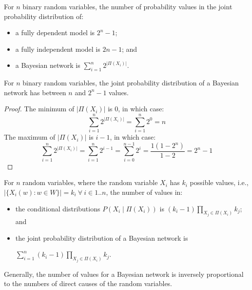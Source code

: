 For $n$ binary random variables, the number of probability values in the joint
probability distribution of:
\begin{itemize}
  \item a fully dependent model is $2^n - 1$;
  \item a fully independent model is $2n - 1$; and
  \item a Bayesian network is $\sum_{i = 1}^{n} 2^{|\Pi(X_i)|}$.
\end{itemize}

\begin{thm}
  For $n$ binary random variables, the joint probability distribution of a
  Bayesian network has between $n$ and $2^n - 1$ values.
  \begin{proof}
    The minimum of $|\Pi(X_i)|$ is 0, in which case:
    \begin{equation}
      \sum_{i = 1}^{n} 2^{|\Pi(X_i)|} = \sum_{i = 1}^{n} 2^0 = n
    \end{equation}
    The maximum of $|\Pi(X_i)|$ is $i - 1$, in which case:
    \begin{equation}
      \sum_{i = 1}^{n} 2^{|\Pi(X_i)|}
      = \sum_{i = 1}^{n} 2^{i - 1}
      = \sum_{i = 0}^{n - 1} 2^i
      = \frac{1 (1 - 2^n)}{1 - 2}
      = 2^n - 1
    \end{equation}
  \end{proof}
\end{thm}

For $n$ random variables, where the random variable $X_i$ has $k_i$ possible
values, i.e., $|\{ X_i(w) : w \in W \}| = k_i \ \forall\ i \in 1 .. n$, the
number of values in:
\begin{itemize}
  \item the conditional distributions $P(X_i \mid \Pi(X_i))$ is
        $(k_i - 1) \prod_{X_j \in \Pi(X_i)} k_j$; and
  \item the joint probability distribution of a Bayesian network is

        $\sum_{i = 1}^{n} (k_i - 1) \prod_{X_j \in \Pi(X_i)} k_j$.
\end{itemize}

Generally, the number of values for a Bayesian network is inversely
proportional to the numbers of direct causes of the random variables.
